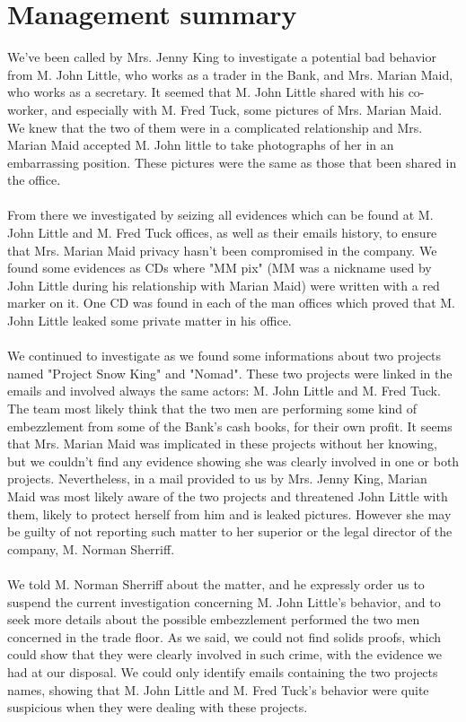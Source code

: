 \section{Management summary}
	We've been called by Mrs. Jenny King to investigate a potential bad behavior from M. John Little, who works as a trader in the Bank, and Mrs. Marian Maid, who works as a secretary. It seemed that M. John Little shared with his co-worker, and especially with M. Fred Tuck, some pictures of Mrs. Marian Maid. We knew that the two of them were in a complicated relationship and Mrs. Marian Maid accepted M. John little to take photographs of her in an embarrassing  position. These pictures were the same as those that been shared in the office.\\~\\
From there we investigated by seizing all evidences which can be found at M. John Little and M. Fred Tuck offices, as well as their emails history, to ensure that Mrs. Marian Maid privacy hasn't been compromised in the company. We found some evidences as CDs where "MM pix" (MM was a nickname used by John Little during his relationship with Marian Maid) were written with a red marker on it. One CD was found in each of the man offices which proved that M. John Little leaked some private matter in his office.\\~\\
We continued to investigate as we found some informations about two projects named "Project Snow King" and "Nomad". These two projects were linked in the emails and involved always the same actors: M. John Little and M. Fred Tuck. The team most likely think that the two men are performing some kind of embezzlement from some of the Bank's cash books, for their own profit. It seems that Mrs. Marian Maid was implicated in these projects without her knowing, but we couldn't find any evidence showing she was clearly involved in one or both projects. Nevertheless, in a mail provided to us by Mrs. Jenny King, Marian Maid was most likely aware of the two projects and threatened John Little with them, likely to protect herself from him and is leaked pictures. However she may be guilty of not reporting such matter to her superior or the legal director of the company, M. Norman Sherriff.\\~\\
We told M. Norman Sherriff about the matter, and he expressly order us to suspend the current investigation concerning M. John Little's behavior, and to seek more details about the possible embezzlement performed the two men concerned in the trade floor. As we said, we could not find solids proofs, which could show that they were clearly involved in such crime, with the evidence we had at our disposal. We could only identify emails containing the two projects names, showing that M. John Little and M. Fred Tuck's behavior were quite suspicious when they were dealing with these projects.